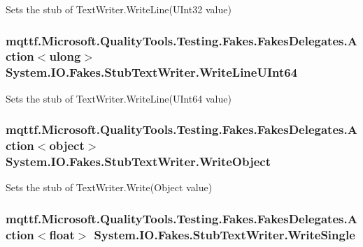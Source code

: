 Sets the stub of Text\-Writer.\-Write\-Line(\-U\-Int32 value)

\hypertarget{class_system_1_1_i_o_1_1_fakes_1_1_stub_text_writer_a165479ee7486cc71e77779d88a2fa0de}{
\subsubsection[{Write\-Line\-U\-Int64}]{\setlength{\rightskip}{0pt plus 5cm}mqttf.\-Microsoft.\-Quality\-Tools.\-Testing.\-Fakes.\-Fakes\-Delegates.\-Action$<$ulong$>$ System.\-I\-O.\-Fakes.\-Stub\-Text\-Writer.\-Write\-Line\-U\-Int64}}\label{class_system_1_1_i_o_1_1_fakes_1_1_stub_text_writer_a165479ee7486cc71e77779d88a2fa0de}


Sets the stub of Text\-Writer.\-Write\-Line(\-U\-Int64 value)

\hypertarget{class_system_1_1_i_o_1_1_fakes_1_1_stub_text_writer_a5b85da0810286ff59162d2bd434c7d59}{
\subsubsection[{Write\-Object}]{\setlength{\rightskip}{0pt plus 5cm}mqttf.\-Microsoft.\-Quality\-Tools.\-Testing.\-Fakes.\-Fakes\-Delegates.\-Action$<$object$>$ System.\-I\-O.\-Fakes.\-Stub\-Text\-Writer.\-Write\-Object}}\label{class_system_1_1_i_o_1_1_fakes_1_1_stub_text_writer_a5b85da0810286ff59162d2bd434c7d59}


Sets the stub of Text\-Writer.\-Write(\-Object value)

\hypertarget{class_system_1_1_i_o_1_1_fakes_1_1_stub_text_writer_ace9f6f2aa0026e077d8958a6218b779f}{
\subsubsection[{Write\-Single}]{\setlength{\rightskip}{0pt plus 5cm}mqttf.\-Microsoft.\-Quality\-Tools.\-Testing.\-Fakes.\-Fakes\-Delegates.\-Action$<$float$>$ System.\-I\-O.\-Fakes.\-Stub\-Text\-Writer.\-Write\-Single}}\label{class_system_1_1_i_o_1_1_fakes_1_1_stub_text_writer_ace9f6f2aa0026e077d8958a6218b779f}


